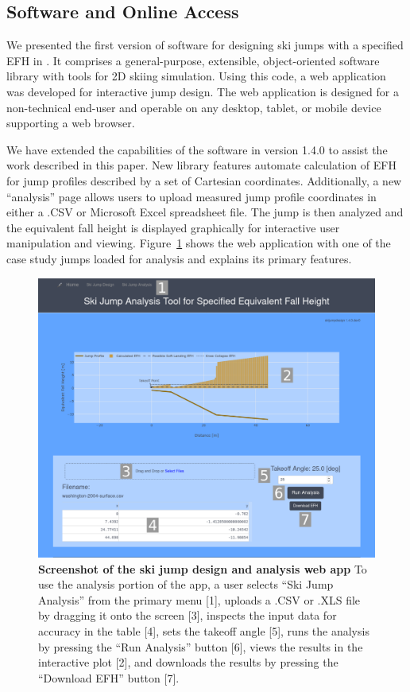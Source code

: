 \documentclass[smallextended]{svjour3}       %
\begin{document}
\subsection{Software and Online Access}
\label{sec:software}
%
We presented the first version of software for designing ski jumps with a
specified EFH in \cite{Moore2018}. It comprises a general-purpose, extensible,
object-oriented software library with tools for 2D skiing simulation. Using
this code, a web application was developed for interactive jump design. The web
application is designed for a non-technical end-user and operable on any
desktop, tablet, or mobile device supporting a web browser.

We have extended the capabilities of the software in version 1.4.0 to assist
the work described in this paper. New library features automate calculation of
EFH for jump profiles described by a set of Cartesian coordinates.
Additionally, a new ``analysis'' page allows users to upload measured jump
profile coordinates in either a .CSV or Microsoft Excel spreadsheet file. The
jump is then analyzed and the equivalent fall height is displayed graphically
for interactive user manipulation and viewing.
Figure~\ref{fig:web-app-screenshot} shows the web application with one of the
case study jumps loaded for analysis and explains its primary features.
%
\begin{figure}
  \centering
  \includegraphics[width=\columnwidth]{figures/web-app-screenshot.png}
  \caption{\textbf{Screenshot of the ski jump design and analysis web app} To
    use the analysis portion of the app, a user selects ``Ski Jump Analysis''
    from the primary menu [1], uploads a .CSV or .XLS file by dragging it onto
    the screen [3], inspects the input data for accuracy in the table [4], sets
    the takeoff angle [5], runs the analysis by pressing the ``Run Analysis''
    button [6], views the results in the interactive plot [2], and downloads
    the results by pressing the ``Download EFH'' button [7].}
  \label{fig:web-app-screenshot}
\end{figure}
\end{document}

